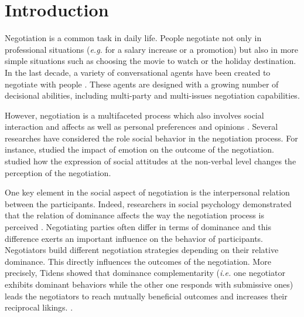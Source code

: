 \documentclass[sigconf]{aamas}  %
\begin{document}
	
	
	\maketitle
	
	
	
	\section{Introduction}
	Negotiation is a common task in daily life. People negotiate not only in professional situations (\emph{e.g.} for a salary increase or a promotion) but also in more simple situations such as choosing the movie to watch or the holiday destination. In the last decade, a variety of conversational agents have been created to negotiate with people \cite{pynadath2013you,gratch2016misrepresentation,klatt2011negotiations}. These agents are designed with a growing number of decisional abilities, including multi-party and multi-issues negotiation capabilities.
	
	However, negotiation is a multifaceted process which also involves social interaction and affects as well as personal preferences and opinions  \cite{bro2010affective}. Several researches have considered the role social behavior in the negotiation process. For instance,  \cite{de2015humans} studied the impact of emotion on the outcome of the negotiation. \cite{traum2008multi} studied how the expression of social attitudes at the non-verbal level changes the perception of the negotiation.
	
	One key element in the social aspect of negotiation is the interpersonal relation between the participants. Indeed, researchers in social psychology demonstrated that the relation of dominance affects the way the negotiation process is perceived \cite{van2006power}. Negotiating parties often differ in terms of dominance and this difference exerts an important influence on the behavior of participants. Negotiators build different negotiation strategies depending on their relative dominance. This directly influences the outcomes of the negotiation. More precisely, Tidens \cite{tiedens2003power} showed that dominance complementarity (\emph{i.e.} one negotiator exhibits dominant behaviors while the other one responds with submissive ones) leads the negotiators to reach mutually beneficial outcomes and increases their reciprocal likings. \cite{wiltermuth2015benefits,tiedens2003power}.
	
\end{document}
